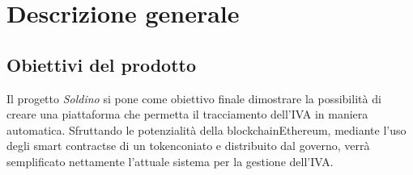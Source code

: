 \section{Descrizione generale} 
\subsection{Obiettivi del prodotto}

Il progetto \textit{Soldino} si pone come obiettivo finale dimostrare la possibilità di creare una piattaforma che permetta il tracciamento dell'IVA in maniera automatica. Sfruttando le potenzialità della blockchain\glosp Ethereum\glo, mediante l'uso degli smart contracts\glosp e di un token\glosp coniato e distribuito dal governo\glo, verrà semplificato nettamente l'attuale sistema per la gestione dell'IVA.


